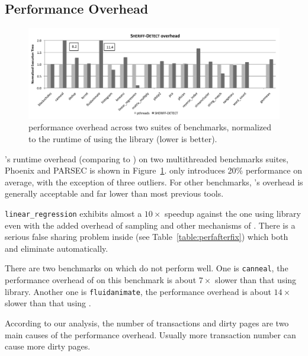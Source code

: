 \subsection{\sheriffdetect{} Performance Overhead}
\label{sec:results-runtime-overhead}

\begin{figure}[!t]
\centering
\includegraphics[width=6in]{sheriff/figure/detectiveperf.pdf}
\caption{\sheriffdetect{} performance overhead across two suites of benchmarks, normalized to the runtime of using the \pthreads{} library (lower is better). \label{fig:overhead}}
\end{figure}


\SheriffDetect{}'s  runtime overhead (comparing to \pthreads{}) on two multithreaded benchmarks suites, Phoenix and PARSEC is shown in Figure~\ref{fig:overhead}.  \SheriffDetect{} only introduces 20\% performance on average, with the exception of three outliers. For other benchmarks, \SheriffDetect{}’s overhead is generally acceptable and far lower than most previous tools.

\texttt{linear\_regression} exhibits almost
a $10\times$ speedup against the one using \pthreads{} library even with the added overhead of sampling and 
other mechanisms of \sheriffdetect{}.  There is a
serious false sharing problem inside (see
Table~\ref{table:perfafterfix}) which both \sheriffdetect{} and \sheriffprotect{} eliminate automatically. 

There are two benchmarks on which \sheriffdetect{} do not perform well. One is \texttt{canneal}, the performance overhead of \sheriffdetect{} on this benchmark is about $7\times$ slower than that using \pthreads{} library. Another one is \texttt{fluidanimate}, the performance overhead is about $14\times$ slower than that using \pthreads{}.

According to our analysis, the number of transactions and dirty pages are two main causes of the performance overhead. Usually more transaction number can cause more dirty pages.   

